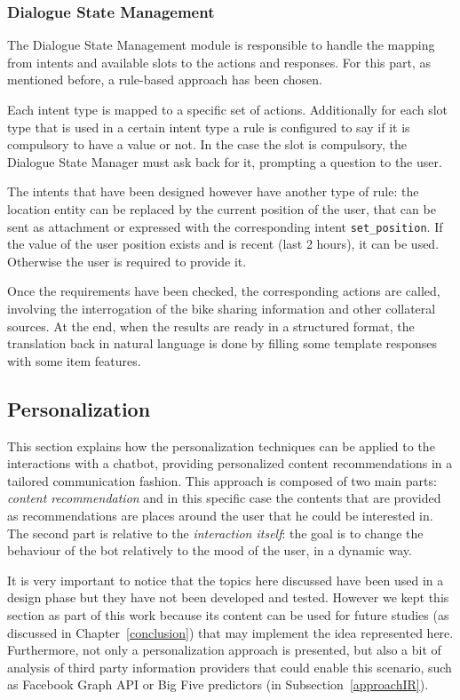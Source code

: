 \subsubsection{Dialogue State Management}
The Dialogue State Management module is responsible to handle the mapping from intents and available slots to the actions and responses. For this part, as mentioned before, a rule-based approach has been chosen.

Each intent type is mapped to a specific set of actions. Additionally for each slot type that is used in a certain intent type a rule is configured to say if it is compulsory to have a value or not. In the case the slot is compulsory, the Dialogue State Manager must ask back for it, prompting a question to the user.

The intents that have been designed however have another type of rule: the location entity can be replaced by the current position of the user, that can be sent as attachment or expressed with the corresponding intent \texttt{set\_position}. If the value of the user position exists and is recent (last 2 hours), it can be used. Otherwise the user is required to provide it.

Once the requirements have been checked, the corresponding actions are called, involving the interrogation of the bike sharing information and other collateral sources. At the end, when the results are ready in a structured format, the translation back in natural language is done by filling some template responses with some item features.

\subsection{Personalization}
\label{approachPersonalization}

This section explains how the personalization techniques can be applied to the interactions with a chatbot, providing personalized content recommendations in a tailored communication fashion. This approach is composed of two main parts: \textit{content recommendation} and in this specific case the contents that are provided as recommendations are places around the user that he could be interested in. The second part is relative to the \textit{interaction itself}: the goal is to change the behaviour of the bot relatively to the mood of the user, in a dynamic way.

It is very important to notice that the topics here discussed have been used in a design phase but they have not been developed and tested. However we kept this section as part of this work because its content can be used for future studies (as discussed in Chapter~\ref{conclusion}) that may implement the idea represented here. Furthermore, not only a personalization approach is presented, but also a bit of analysis of third party information providers that could enable this scenario, such as Facebook Graph API or Big Five predictors (in Subsection~\ref{approachIR}).

